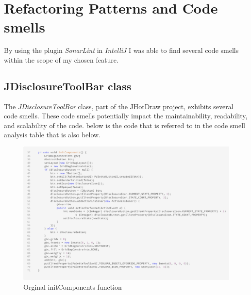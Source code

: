 \section{Refactoring Patterns and Code smells}

By using the plugin \textit{SonarLint} in \textit{IntelliJ} I was able to find several code smells within the
scope of my chosen feature.

\subsection{JDisclosureToolBar class}


The \textit{JDisclosureToolBar} class, part of the JHotDraw project, exhibits several code smells.
These code smells potentially impact the maintainability, readability, and scalability of the code.
below is the code that is referred to in the code smell analysis table that is also below.

\begin{figure}[H]
    \centering
    \includegraphics[width=\linewidth]{pic/initComponents.png}
    \caption{Orginal initComponents function}
    \label{fig:Orginal initComponents function}
\end{figure}


